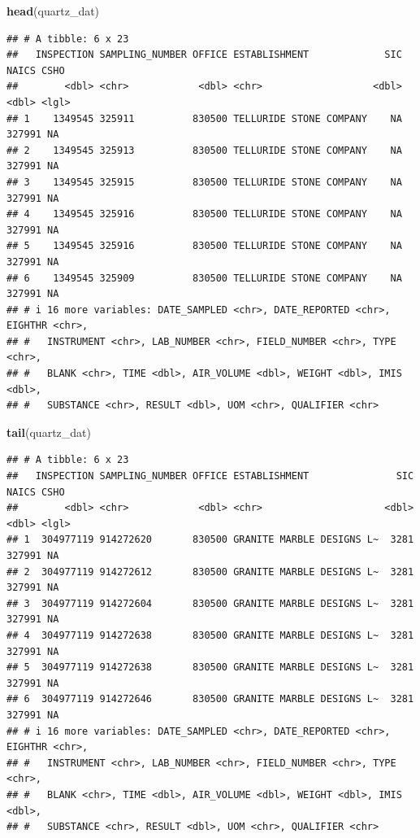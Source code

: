 \documentclass[
]{article}
\newenvironment{Shaded}{\begin{snugshade}}{\end{snugshade}}
\newcommand{\FunctionTok}[1]{\textcolor[rgb]{0.13,0.29,0.53}{\textbf{#1}}}
\newcommand{\NormalTok}[1]{#1}
\begin{document}
\begin{Shaded}
\begin{Highlighting}[]
\FunctionTok{head}\NormalTok{(quartz\_dat) }
\end{Highlighting}
\end{Shaded}

\begin{verbatim}
## # A tibble: 6 x 23
##   INSPECTION SAMPLING_NUMBER OFFICE ESTABLISHMENT             SIC  NAICS CSHO 
##        <dbl> <chr>            <dbl> <chr>                   <dbl>  <dbl> <lgl>
## 1    1349545 325911          830500 TELLURIDE STONE COMPANY    NA 327991 NA   
## 2    1349545 325913          830500 TELLURIDE STONE COMPANY    NA 327991 NA   
## 3    1349545 325915          830500 TELLURIDE STONE COMPANY    NA 327991 NA   
## 4    1349545 325916          830500 TELLURIDE STONE COMPANY    NA 327991 NA   
## 5    1349545 325916          830500 TELLURIDE STONE COMPANY    NA 327991 NA   
## 6    1349545 325909          830500 TELLURIDE STONE COMPANY    NA 327991 NA   
## # i 16 more variables: DATE_SAMPLED <chr>, DATE_REPORTED <chr>, EIGHTHR <chr>,
## #   INSTRUMENT <chr>, LAB_NUMBER <chr>, FIELD_NUMBER <chr>, TYPE <chr>,
## #   BLANK <chr>, TIME <dbl>, AIR_VOLUME <dbl>, WEIGHT <dbl>, IMIS <dbl>,
## #   SUBSTANCE <chr>, RESULT <dbl>, UOM <chr>, QUALIFIER <chr>
\end{verbatim}

\begin{Shaded}
\begin{Highlighting}[]
\FunctionTok{tail}\NormalTok{(quartz\_dat)}
\end{Highlighting}
\end{Shaded}

\begin{verbatim}
## # A tibble: 6 x 23
##   INSPECTION SAMPLING_NUMBER OFFICE ESTABLISHMENT               SIC  NAICS CSHO 
##        <dbl> <chr>            <dbl> <chr>                     <dbl>  <dbl> <lgl>
## 1  304977119 914272620       830500 GRANITE MARBLE DESIGNS L~  3281 327991 NA   
## 2  304977119 914272612       830500 GRANITE MARBLE DESIGNS L~  3281 327991 NA   
## 3  304977119 914272604       830500 GRANITE MARBLE DESIGNS L~  3281 327991 NA   
## 4  304977119 914272638       830500 GRANITE MARBLE DESIGNS L~  3281 327991 NA   
## 5  304977119 914272638       830500 GRANITE MARBLE DESIGNS L~  3281 327991 NA   
## 6  304977119 914272646       830500 GRANITE MARBLE DESIGNS L~  3281 327991 NA   
## # i 16 more variables: DATE_SAMPLED <chr>, DATE_REPORTED <chr>, EIGHTHR <chr>,
## #   INSTRUMENT <chr>, LAB_NUMBER <chr>, FIELD_NUMBER <chr>, TYPE <chr>,
## #   BLANK <chr>, TIME <dbl>, AIR_VOLUME <dbl>, WEIGHT <dbl>, IMIS <dbl>,
## #   SUBSTANCE <chr>, RESULT <dbl>, UOM <chr>, QUALIFIER <chr>
\end{verbatim}
\end{document}
